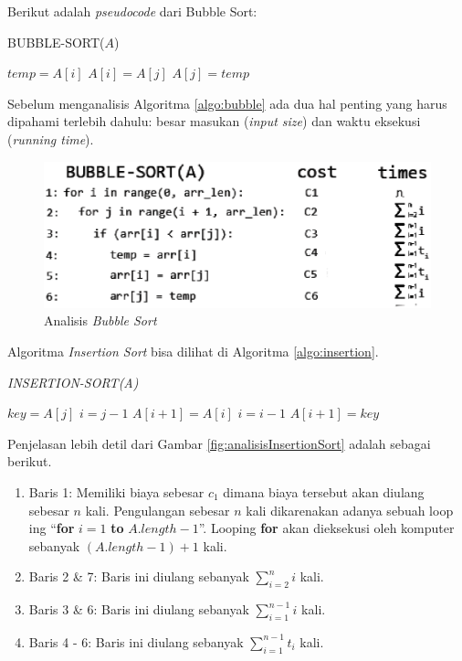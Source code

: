 Berikut adalah \textit{pseudocode} dari Bubble Sort:

\begin{algorithm}
	\caption{BUBBLE-SORT($A$)}
	\label{algo:bubble}
	\begin{algorithmic}[1]
			\STATE $temp = A[i]$
			\STATE $A[i] = A[j]$
			\STATE $A[j] = temp$
			\ENDIF
		\ENDFOR
	\ENDFOR
	\end{algorithmic}
\end{algorithm}

Sebelum menganalisis Algoritma \ref{algo:bubble} ada dua hal penting yang harus dipahami terlebih dahulu: besar masukan (\textit{input size}) dan waktu eksekusi (\textit{running time}). 
\begin{figure}[htbp]%
	\includegraphics[scale=0.6]{fig/BubbleAnalysis}%
	\caption{Analisis \textit{Bubble Sort}}%
	\label{fig:analisisBubbleSort}%
\end{figure}

\FloatBarrier

Algoritma \textit{Insertion Sort} bisa dilihat di Algoritma \ref{algo:insertion}. 
\begin{algorithm}[H]
	\caption{\textit{INSERTION-SORT(A)}}
	\label{algo:insertion}
	\begin{algorithmic}[1]
		\STATE $key = A[j]$
		\STATE $i = j - 1$
			\STATE $A[i+1] = A[i]$
			\STATE $i = i - 1$
		\ENDWHILE
		\STATE $A[i+1] = key$
	\ENDFOR
	\end{algorithmic}
\end{algorithm} 

Penjelasan lebih detil dari Gambar \ref{fig:analisisInsertionSort} adalah sebagai berikut.
\begin{enumerate}
	\item Baris 1: Memiliki biaya sebesar $c_1$ dimana biaya tersebut akan diulang sebesar $n$ kali. Pengulangan sebesar $n$ kali dikarenakan adanya sebuah loop	ing ``\textbf{for} $i=1$ \textbf{to} $A.length-1$''. Looping \textbf{for} akan dieksekusi oleh komputer sebanyak $(A.length-1)+1$ kali.
	\item Baris 2 \& 7: Baris ini diulang sebanyak $\sum\limits_{i=2}^n i$ kali. 
	\item Baris 3 \& 6: Baris ini diulang sebanyak $\sum\limits_{i=1}^{n-1} i$ kali.
	\item Baris 4 - 6: Baris ini diulang sebanyak $\sum\limits_{i=1}^{n-1} t_{i}$ kali.
\end{enumerate} 

